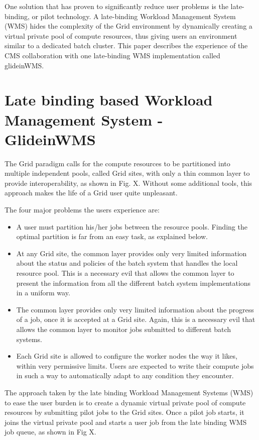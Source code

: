 \documentclass[a4paper]{jpconf}
\begin{document}
One solution that has proven to significantly reduce user problems is the late-binding, or pilot technology.  
A late-binding Workload Management System (WMS) hides the complexity of the Grid environment by dynamically creating 
a virtual private pool of compute resources, thus giving users an environment similar to a dedicated batch cluster.
This paper describes the experience of the CMS collaboration with one late-binding WMS implementation called glideinWMS. 


\section{Late binding based Workload Management System - GlideinWMS }

The Grid paradigm calls for the compute resources to be partitioned into multiple independent pools, called Grid sites,
with only a thin common layer to provide interoperability, as shown in Fig. X.
Without some additional tools, this approach makes the life of a Grid user quite unpleasant. 

The four major problems the users experience are:
\begin {itemize}
\item 
A user must partition his/her jobs between the resource pools.
Finding the optimal partition is far from an easy task, as explained below.
\item
At any Grid site, the common layer provides only very limited information about the status and policies of the
batch system that handles the local resource pool.
This is a necessary evil that allows the common layer to present the information from all the different batch system 
implementations in a uniform way. 
\item 
The common layer provides only very limited information about the progress of a job, once it is accepted at a Grid site.
Again, this is a necessary evil that allows the common layer to monitor jobs submitted to different batch systems.  
\item
Each Grid site is allowed to configure the worker nodes the way it likes, within very permissive limits.
Users are expected to write their compute jobs in such a way to automatically adapt to any condition they encounter.
\end{itemize}

The approach taken by the late binding Workload Management Systems (WMS) to ease the user burden is 
to create a dynamic virtual private pool of compute resources by submitting pilot jobs to the Grid sites.
Once a pilot job starts, it joins the virtual private pool and starts a user job from the late binding WMS job queue, 
as shown in Fig X.
\end{document}
